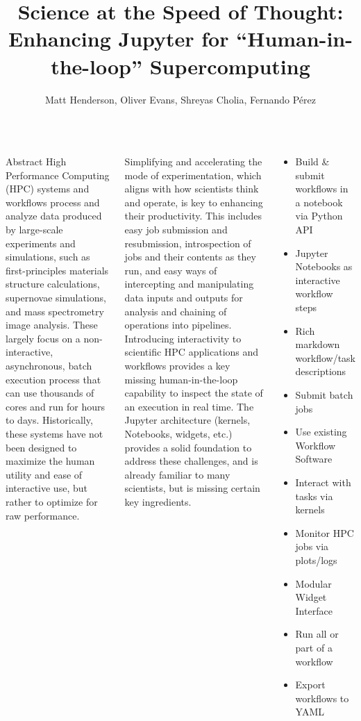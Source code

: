 \documentclass{tikzposter}
\author{Matt Henderson, Oliver Evans, Shreyas Cholia, Fernando P\'{e}rez}
\title{Science at the Speed of Thought: Enhancing Jupyter for ``Human-in-the-loop'' Supercomputing}
\institute{Lawrence Berkeley National Laboratory}
\begin{document}
\maketitle

\begin{columns}

 {
Abstract
     High Performance Computing (HPC) systems and workflows process and analyze data produced by large-scale experiments and simulations, such as first-principles materials structure calculations, supernovae simulations, and mass spectrometry image analysis. 
 These largely focus on a non-interactive, asynchronous, batch execution process that can use thousands of cores and run for hours to days. 
 Historically, these systems have not been designed to maximize the human utility and ease of interactive use, but rather to optimize for raw performance. 

     Simplifying and accelerating the mode of experimentation, which aligns with how scientists think and operate, is key to enhancing their productivity. 
 This includes easy job submission and resubmission, introspection of jobs and their contents as they run, and easy ways of intercepting and manipulating data inputs and outputs for analysis and chaining of operations into pipelines. 
 Introducing interactivity to scientific HPC applications and workflows provides a key missing human-in-the-loop capability to inspect the state of an execution in real time. 
 The Jupyter architecture (kernels, Notebooks, widgets, etc.) provides a solid foundation to address these challenges, and is already familiar to many scientists, but is missing certain key ingredients. 
}

 {
\begin{multicols}{2}
\begin{itemize}
    \item  Build \& submit workflows in a notebook via Python API
    \item  Jupyter Notebooks as interactive workflow steps
    \item  Rich markdown workflow/task descriptions
    \item  Submit batch jobs
    \item  Use existing Workflow Software
    \item  Interact with tasks via kernels
    \item  Monitor HPC jobs via plots/logs
    \item  Modular Widget Interface
    \item  Run all or part of a workflow
    \item  Export workflows to YAML
\end{itemize}
\end{multicols}
}


\end{columns}
\end{document}
